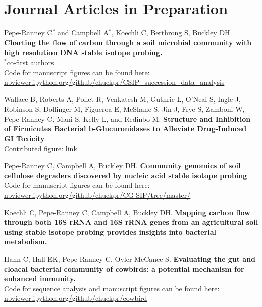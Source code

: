 \documentclass[letterpaper]{article}
\renewenvironment{itemize}{
  \begin{list}{}{
    \setlength{\leftmargin}{1.5em}
  }
}{
  \end{list}
}
\begin{document}
\section*{Journal Articles in Preparation}
\begin{itemize}
\item Pepe-Ranney C$^{*}$ and Campbell A$^{*}$, Koechli C, Berthrong S, 
    Buckley DH. \textbf{Charting the flow of carbon through a soil
        microbial community with high resolution DNA stable isotope
        probing.}\\
    {\small$^{*}$co-first authors}\\
    Code for manuscript figures can be found here:\\
    \href{http://nbviewer.ipython.org/github/chuckpr/CSIP_succession_data_analysis}
    {nbviewer.ipython.org/github/chuckpr/CSIP\_succession\_data\_analysis}
\item Wallace B, Roberts A, Pollet R, Venkatesh M, 
    Guthrie L, O'Neal S, Ingle J, Robinson S, Dollinger M, Figueroa E, 
    McShane S, Jin J, Frye S, Zamboni W, Pepe-Ranney C, Mani S, Kelly
    L, and Redinbo M. \textbf{Structure and Inhibition of Firmicutes
    Bacterial b-Glucuronidases to Alleviate Drug-Induced GI Toxicity}\\
    Contributed figure: \href{http://github.com/chuckpr/loop_tree}{link}
\item Pepe-Ranney C, Campbell A, Buckley DH. 
    \textbf{Community genomics of soil cellulose degraders discovered by nucleic acid stable isotope probing}\\
    Code for manuscript figures can be found here:\\
    \href{http://nbviewer.ipython.org/github/chuckpr/CG-SIP}
    {nbviewer.ipython.org/github/chuckpr/CG-SIP/tree/master/}
\item Koechli C, Pepe-Ranney C, Campbell A, Buckley DH. \textbf{Mapping
    carbon flow through both 16S rRNA and 16S rRNA genes from an
    agricultural soil using stable isotope probing provides
    insights into bacterial metabolism.}
\item Hahn C, Hall EK, Pepe-Ranney C, Oyler-McCance S.
    \textbf{Evaluating the gut and cloacal bacterial community of
    cowbirds: a potential mechanism for enhanced immunity.}\\
    Code for sequence analysis and manuscript figures can be found here:\\
    \href{http://nbviewer.ipython.org/github/chuckpr/cowbird}
    {nbviewer.ipython.org/github/chuckpr/cowbird}
\end{itemize}
\end{document}
